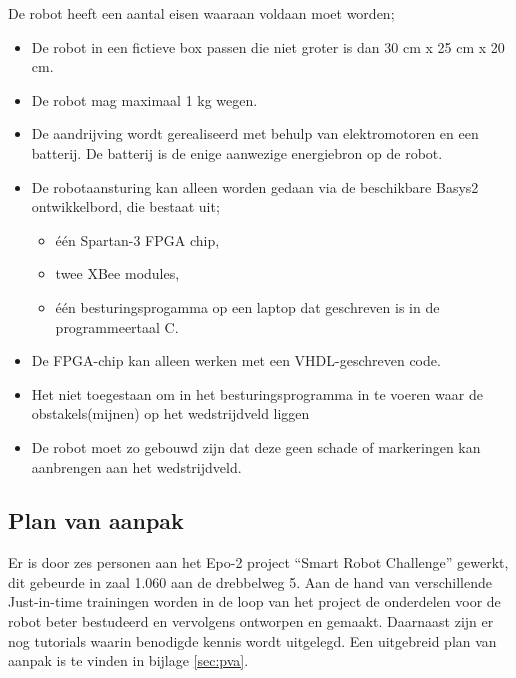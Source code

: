 \documentclass{report}
\begin{document}
De robot heeft een aantal eisen waaraan voldaan moet worden;

\begin{itemize}

\item
De robot in een fictieve box passen die niet groter is dan 30 cm x 25 cm x 20 cm.

\item
De robot mag maximaal 1 kg wegen.

\item
De aandrijving wordt gerealiseerd met behulp van elektromotoren en een batterij. De batterij is de enige aanwezige energiebron op de robot.

\item
De robotaansturing kan alleen worden gedaan via de beschikbare Basys2 ontwikkelbord, die bestaat uit;

\begin{itemize}

\item
één Spartan-3 FPGA chip,

\item
twee XBee modules,

\item
één besturingsprogamma op een laptop dat geschreven is in de programmeertaal C. 

\end{itemize}

\item
De FPGA-chip kan alleen werken met een VHDL-geschreven code.

\item
Het niet toegestaan om in het besturingsprogramma in te voeren waar de obstakels(mijnen) op het wedstrijdveld liggen 

\item
De robot moet zo gebouwd zijn dat deze geen schade of markeringen kan aanbrengen aan het wedstrijdveld.

\end{itemize}

\subsection{Plan van aanpak}

Er is door zes personen aan het Epo-2 project “Smart Robot Challenge” gewerkt, dit gebeurde in zaal 1.060 aan de drebbelweg 5. Aan de hand van verschillende Just-in-time trainingen worden in de loop van het project de onderdelen voor de robot beter bestudeerd en vervolgens ontworpen en gemaakt. Daarnaast zijn er nog tutorials waarin benodigde kennis wordt uitgelegd. Een uitgebreid plan van aanpak is te vinden in bijlage \ref{sec:pva}.
\end{document}
